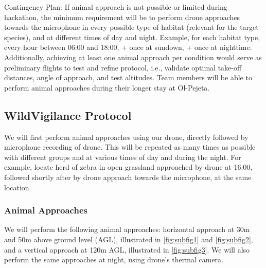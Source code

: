 \documentclass[final,5p,times,twocolumn]{elsarticle}
\begin{document}
Contingency Plan:
If animal approach is not possible or limited during hackathon, the minimum requirement will be
to perform drone approaches towards the microphone in every possible type of habitat (relevant
for the target species), and at different times of day and night.
Example, for each habitat type, every hour between 06:00 and 18:00, + once at sundown, + once at
nighttime.
Additionally, achieving at least one animal approach per condition would serve as preliminary
flights to test and refine protocol, i.e., validate optimal take-off distances, angle of approach, and
test altitudes. Team members will be able to perform animal approaches during their longer stay at Ol-Pejeta.



\subsection{WildVigilance Protocol}
We will first perform animal approaches using our drone, directly followed by microphone recording of drone. 
This will be repeated as many times as possible with different groups and at various times of day and during the night.
For example, locate herd of zebra in open grassland approached by drone at 16:00, followed shortly after by drone
approach towards the microphone, at the same location.

\subsubsection{Animal Approaches}
We will perform the following animal approaches: horizontal approach at 30m and 50m above ground level (AGL), illustrated in
\cref{fig:subfig1} and \cref{fig:subfig2}, and a vertical approach at 120m AGL, illustrated in \cref{fig:subfig3}.
We will also perform the same approaches at night, using drone's thermal camera.
\end{document}
